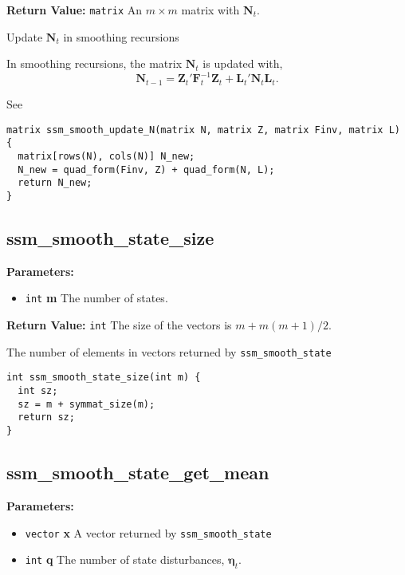 \documentclass[]{book}
\providecommand{\tightlist}{%
  \setlength{\itemsep}{0pt}\setlength{\parskip}{0pt}}
\newcommand{\mat}[1]{\boldsymbol{#1}}
\renewcommand{\vec}[1]{\boldsymbol{#1}}
\begin{document}
\textbf{Return Value:} \texttt{matrix} An \(m \times m\) matrix with
\(\vec{N}_t\).

Update \(\mat{N}_t\) in smoothing recursions

In smoothing recursions, the matrix \(\vec{N}_t\) is updated with, \[
\mat{N}_{t - 1} = \mat{Z}_t' \mat{F}^{-1}_t \mat{Z}_t + \mat{L}_t' \mat{N}_t \mat{L}_t .
\]

See \autocite[p.~91]{DurbinKoopman2012}

\begin{verbatim}
matrix ssm_smooth_update_N(matrix N, matrix Z, matrix Finv, matrix L) {
  matrix[rows(N), cols(N)] N_new;
  N_new = quad_form(Finv, Z) + quad_form(N, L);
  return N_new;
}

\end{verbatim}

\subsection{ssm\_smooth\_state\_size}\label{ssmux5fsmoothux5fstateux5fsize}

\textbf{Parameters:}

\begin{itemize}
\tightlist
\item
  \texttt{int} \textbf{m} The number of states.
\end{itemize}

\textbf{Return Value:} \texttt{int} The size of the vectors is
\(m + m (m + 1) / 2\).

The number of elements in vectors returned by
\texttt{ssm\_smooth\_state}

\begin{verbatim}
int ssm_smooth_state_size(int m) {
  int sz;
  sz = m + symmat_size(m);
  return sz;
}
\end{verbatim}

\subsection{ssm\_smooth\_state\_get\_mean}\label{ssmux5fsmoothux5fstateux5fgetux5fmean}

\textbf{Parameters:}

\begin{itemize}
\tightlist
\item
  \texttt{vector} \textbf{x} A vector returned by
  \texttt{ssm\_smooth\_state}
\item
  \texttt{int} \textbf{q} The number of state disturbances,
  \(\vec{\eta}_t\).
\end{itemize}
\end{document}
